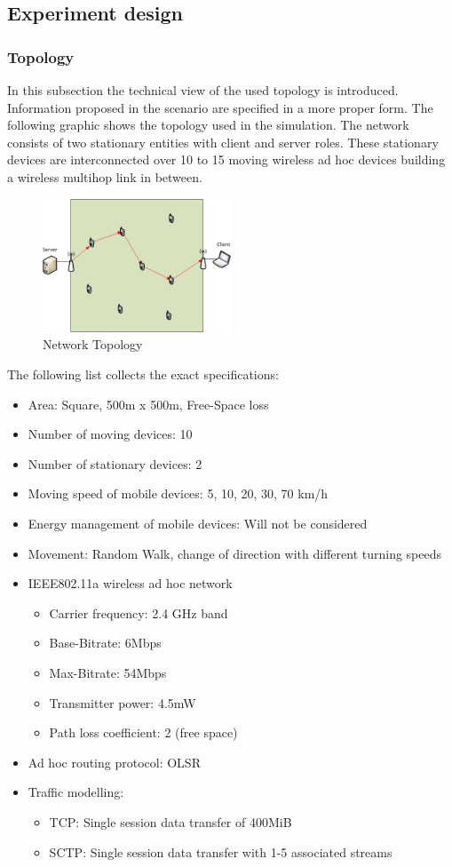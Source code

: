 \documentclass[a4paper]{article}
\begin{document}
\subsection{Experiment design}
\subsubsection{Topology}
In this subsection the technical view of the used topology is introduced. Information proposed in the scenario are specified in a more proper form. The following graphic shows the topology used in the simulation. The network consists of two stationary entities with client and server roles. These stationary devices are interconnected over 10 to 15 moving wireless ad hoc devices building a wireless multihop link in between.
\begin{figure}[H]
	\centering
	\includegraphics[width=0.5\textwidth]{imgs/Topology}
	\caption{Network Topology}
	\label{fig:topology}
\end{figure}
The following list collects the exact specifications:
\begin{itemize}
	\item Area: Square, 500m x 500m, Free-Space loss
	\item Number of moving devices: 10
	\item Number of stationary devices: 2
	\item Moving speed of mobile devices: 5, 10, 20, 30, 70 km/h
	\item Energy management of mobile devices: Will not be considered
	\item Movement: Random Walk, change of direction with different turning speeds
	\item IEEE802.11a wireless ad hoc network
	\begin{itemize}
		\item Carrier frequency: 2.4 GHz band
		\item Base-Bitrate: 6Mbps
		\item Max-Bitrate: 54Mbps
		\item Transmitter power: 4.5mW
		\item Path loss coefficient: 2 (free space)
	\end{itemize}
	\item Ad hoc routing protocol: OLSR
	\item Traffic modelling: 
	\begin{itemize}
		\item TCP: Single session data transfer of 400MiB
		\item SCTP: Single session data transfer with 1-5 associated streams 
	\end{itemize}
\end{itemize}			
\end{document}
